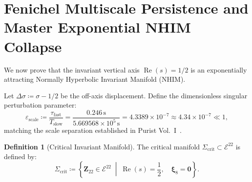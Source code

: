 \documentclass[11pt,a4paper,reqno]{article}
\theoremstyle{plain}
\theoremstyle{definition}
\newtheorem{definition}[theorem]{Definition}
\theoremstyle{remark}
\numberwithin{equation}{section}
\begin{document}
\section{Fenichel Multiscale Persistence and Master Exponential NHIM Collapse}
\label{sec:fenichel_persistence}

We now prove that the invariant vertical axis $\operatorname{Re}(s) = 1/2$ is an exponentially attracting Normally Hyperbolic Invariant Manifold (NHIM).

Let $\Delta\sigma \coloneqq \sigma - 1/2$ be the off-axis displacement. Define the dimensionless singular perturbation parameter:
\begin{equation}
  \varepsilon_{\mathrm{scale}} \coloneqq \frac{\tau_{\mathrm{fast}}}{T_{\mathrm{slow}}} = \frac{0.246\,\mathrm{s}}{5.669568 \times 10^5\,\mathrm{s}} = 4.3389 \times 10^{-7} \approx 4.34 \times 10^{-7} \ll 1,
\end{equation}
matching the scale separation established in Purist Vol.~I~\cite{PuristVol1Monograph2026}.

\begin{definition}[Critical Invariant Manifold]
The critical manifold $\Sigma_{\mathrm{crit}} \subset \mathcal{E}^{22}$ is defined by:
\begin{equation}
  \Sigma_{\mathrm{crit}} \coloneqq \left\{ \bm{Z}_{22} \in \mathcal{E}^{22} \;\middle|\; \operatorname{Re}(s) = \frac{1}{2}, \quad \bm{\xi}_8 = \bm{0} \right\}.
\end{equation}
\end{definition}
\end{document}
